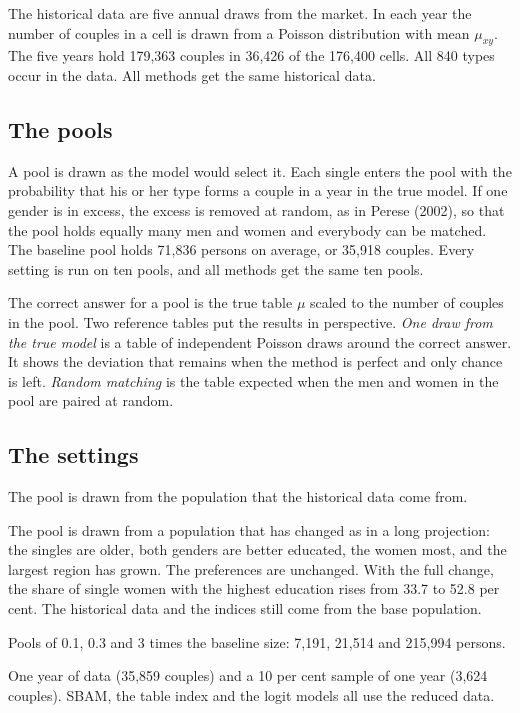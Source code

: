 \documentclass[12pt,a4paper]{article}
\begin{document}
The historical data are five annual draws from the market. In each year the number of couples in
a cell is drawn from a Poisson distribution with mean $\mu_{xy}$. The five years hold 179,363
couples in 36,426 of the 176,400 cells. All 840 types occur in the data. All methods get the same
historical data.

\subsection{The pools}

A pool is drawn as the model would select it. Each single enters the pool with the probability
that his or her type forms a couple in a year in the true model. If one gender is in excess, the
excess is removed at random, as in Perese (2002), so that the pool holds equally many men and
women and everybody can be matched. The baseline pool holds 71,836 persons on average, or 35,918
couples. Every setting is run on ten pools, and all methods get the same ten pools.

The correct answer for a pool is the true table $\mu$ scaled to the number of couples in the
pool. Two reference tables put the results in perspective. \emph{One draw from the true model} is
a table of independent Poisson draws around the correct answer. It shows the deviation that
remains when the method is perfect and only chance is left. \emph{Random matching} is the table
expected when the men and women in the pool are paired at random.

\subsection{The settings}

\begin{description}[leftmargin=1.2em, style=nextline, itemsep=4pt]
\item[Baseline.] The pool is drawn from the population that the historical data come from.

\item[Changed population.] The pool is drawn from a population that has changed as in a long
projection: the singles are older, both genders are better educated, the women most, and the
largest region has grown. The preferences are unchanged. With the full change, the share of
single women with the highest education rises from 33.7 to 52.8 per cent. The historical data and
the indices still come from the base population.

\item[Pool size.] Pools of 0.1, 0.3 and 3 times the baseline size: 7,191, 21,514 and 215,994
persons.

\item[Less historical data.] One year of data (35,859 couples) and a 10 per cent sample of one
year (3,624 couples). SBAM, the table index and the logit models all use the reduced data.
\end{description}
\end{document}
